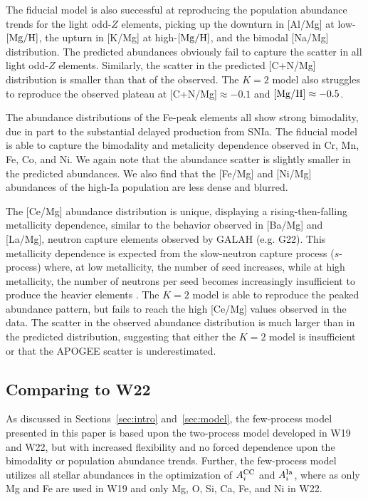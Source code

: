 \documentclass[modern]{aastex631}
\newcommand{\mgh}{[{\rm Mg}/{\rm H}]}
\newcommand{\Acc}{A^{\rm CC}_{i}}
\newcommand{\AIa}{A^{\rm Ia}_{i}}
\begin{document}
The fiducial model is also successful at reproducing the population abundance trends for the light odd-$Z$ elements, picking up the downturn in [Al/Mg] at low-$\mgh$, the upturn in [K/Mg] at high-$\mgh$, and the bimodal [Na/Mg] distribution. The predicted abundances obviously fail to capture the scatter in all light odd-$Z$ elements. Similarly, the scatter in the predicted [C+N/Mg] distribution is smaller than that of the observed. The $K=2$ model also struggles to reproduce the observed plateau at [C+N/Mg]$\approx -0.1$ and $\mgh\approx-0.5$. 

The abundance distributions of the Fe-peak elements all show strong bimodality, due in part to the substantial delayed production from SNIa. The fiducial model is able to capture the bimodality and metalicity dependence observed in Cr, Mn, Fe, Co, and Ni. We again note that the abundance scatter is slightly smaller in the predicted abundances. We also find that the [Fe/Mg] and [Ni/Mg] abundances of the high-Ia population are less dense and blurred.

The [Ce/Mg] abundance distribution is unique, displaying a rising-then-falling metallicity dependence, similar to the behavior observed in [Ba/Mg] and [La/Mg], neutron capture elements observed by GALAH (e.g. G22). This metallicity dependence is expected from the slow-neutron capture process ($s$-process) where, at low metallicity, the number of seed increases, while at high metallicity, the number of neutrons per seed becomes increasingly insufficient to produce the heavier elements \citep{gallino1998}. The $K=2$ model is able to reproduce the peaked abundance pattern, but fails to reach the high [Ce/Mg] values observed in the data. The scatter in the observed abundance distribution is much larger than in the predicted distribution, suggesting that either the $K=2$ model is insufficient or that the APOGEE scatter is underestimated.

\subsection{Comparing to W22}\label{subsec:w22}

As discussed in Sections~\ref{sec:intro} and~\ref{sec:model}, the few-process model presented in this paper is based upon the two-process model developed in W19 and W22, but with increased flexibility and no forced dependence upon the bimodality or population abundance trends. Further, the few-process model utilizes all stellar abundances in the optimization of $\Acc$ and $\AIa$, where as only Mg and Fe are used in W19 and only Mg, O, Si, Ca, Fe, and Ni in W22. 
\end{document}
